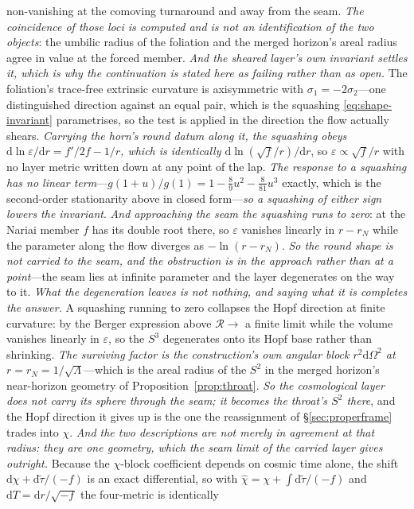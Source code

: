 \documentclass[11pt,a4paper]{article}
\theoremstyle{plain}
\theoremstyle{definition}
\theoremstyle{remark}
\newcommand{\dd}{\mathrm{d}}   %
\begin{document}
non-vanishing at the comoving turnaround and away from the seam. \emph{The coincidence of those loci is computed and is not an identification of the two objects}: the umbilic radius of the foliation and the merged horizon's areal radius agree in value at the forced member. \emph{And the sheared layer's own invariant settles it, which is why the continuation is stated here as failing rather than as open.} The foliation's trace-free extrinsic curvature is axisymmetric with $\sigma_1=-2\sigma_2$---one distinguished direction against an equal pair, which is the squashing \eqref{eq:shape-invariant} parametrises, so the test is applied in the direction the flow actually shears. \emph{Carrying the horn's round datum along it, the squashing obeys $\dd\ln\varepsilon/\dd r=f'/2f-1/r$, which is identically $\dd\ln(\sqrt f/r)/\dd r$}, so $\varepsilon\propto\sqrt f/r$ with no layer metric written down at any point of the lap. \emph{The response to a squashing has no linear term}---$g(1+u)/g(1)=1-\tfrac89u^2-\tfrac{8}{81}u^3$ exactly, which is the second-order stationarity above in closed form---\emph{so a squashing of either sign lowers the invariant}. \emph{And approaching the seam the squashing runs to zero}: at the Nariai member $f$ has its double root there, so $\varepsilon$ vanishes linearly in $r-r_{N}$ while the parameter along the flow diverges as $-\ln(r-r_{N})$. \emph{So the round shape is not carried to the seam, and the obstruction is in the approach rather than at a point}---the seam lies at infinite parameter and the layer degenerates on the way to it. \emph{What the degeneration leaves is not nothing, and saying what it is completes the answer.} A squashing running to zero collapses the Hopf direction at finite curvature: by the Berger expression above $\mathcal R\to$ a finite limit while the volume vanishes linearly in $\varepsilon$, so the $S^3$ degenerates onto its Hopf base rather than shrinking. \emph{The surviving factor is the construction's own angular block $r^2\dd\Omega^2$ at $r=r_{N}=1/\sqrt\Lambda$}---which is the areal radius of the $S^2$ in the merged horizon's near-horizon geometry of Proposition~\ref{prop:throat}. \emph{So the cosmological layer does not carry its sphere through the seam; it becomes the throat's $S^2$ there}, and the Hopf direction it gives up is the one the reassignment of \S\ref{sec:properframe} trades into $\chi$. \emph{And the two descriptions are not merely in agreement at that radius: they are one geometry, which the seam limit of the carried layer gives outright.} Because the $\chi$-block coefficient depends on cosmic time alone, the shift $\dd\chi+\dd\tilde\tau/(-f)$ is an exact differential, so with $\hat\chi=\chi+\int\dd\tilde\tau/(-f)$ and $\dd T=\dd r/\sqrt{-f}$ the four-metric is identically
\end{document}
